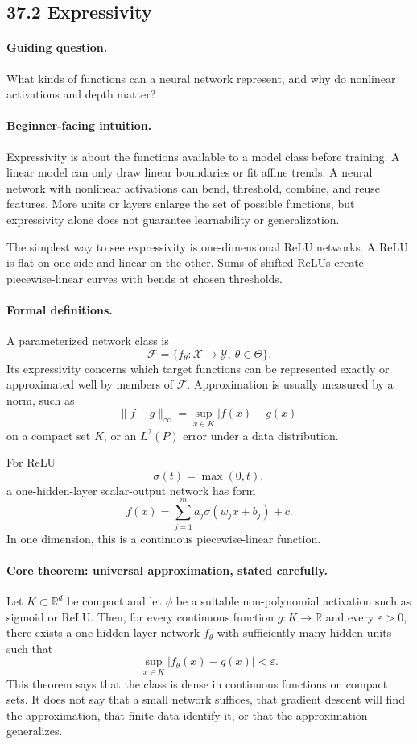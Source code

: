\subsection{37.2 Expressivity}

\paragraph{Guiding question.}
What kinds of functions can a neural network represent, and why do nonlinear activations and depth matter?

\paragraph{Beginner-facing intuition.}
Expressivity is about the functions available to a model class before training. A linear model can only draw linear boundaries or fit affine trends. A neural network with nonlinear activations can bend, threshold, combine, and reuse features. More units or layers enlarge the set of possible functions, but expressivity alone does not guarantee learnability or generalization.

The simplest way to see expressivity is one-dimensional ReLU networks. A ReLU is flat on one side and linear on the other. Sums of shifted ReLUs create piecewise-linear curves with bends at chosen thresholds.

\paragraph{Formal definitions.}
A parameterized network class is
\[
\mathcal F=\{f_\theta:\mathcal X\to\mathcal Y,\ \theta\in\Theta\}.
\]
Its expressivity concerns which target functions can be represented exactly or approximated well by members of \(\mathcal F\). Approximation is usually measured by a norm, such as
\[
\|f-g\|_\infty=\sup_{x\in K}|f(x)-g(x)|
\]
on a compact set \(K\), or an \(L^2(P)\) error under a data distribution.

For ReLU
\[
\sigma(t)=\max(0,t),
\]
a one-hidden-layer scalar-output network has form
\[
f(x)=\sum_{j=1}^m a_j\sigma(w_jx+b_j)+c.
\]
In one dimension, this is a continuous piecewise-linear function.

\paragraph{Core theorem: universal approximation, stated carefully.}
Let \(K\subset\mathbb R^d\) be compact and let \(\phi\) be a suitable non-polynomial activation such as sigmoid or ReLU. Then, for every continuous function \(g:K\to\mathbb R\) and every \(\varepsilon>0\), there exists a one-hidden-layer network \(f_\theta\) with sufficiently many hidden units such that
\[
\sup_{x\in K}|f_\theta(x)-g(x)|<\varepsilon.
\]
This theorem says that the class is dense in continuous functions on compact sets. It does not say that a small network suffices, that gradient descent will find the approximation, that finite data identify it, or that the approximation generalizes.

